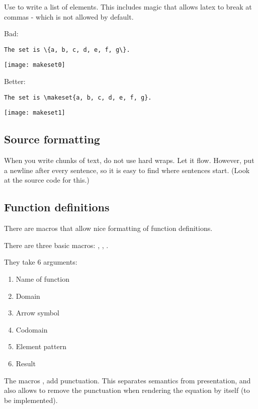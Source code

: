 Use \str{\makeset} to write a list of elements.
This includes magic that allows latex to break at commas - which is not allowed by default.

Bad:

\begin{verbatim}
The set is \{a, b, c, d, e, f, g\}.
\end{verbatim}
\begin{widepar}
    \centering
    \texttt{[image: makeset0]}
\end{widepar}

Better:

\begin{verbatim}
The set is \makeset{a, b, c, d, e, f, g}.
\end{verbatim}

\begin{widepar}
    \centering
    \texttt{[image: makeset1]}
\end{widepar}

\subsection{Source formatting}

When you write chunks of text, do not use hard wraps.
Let it flow.
However, put a newline after every sentence, so it is easy to find where sentences start.
(Look at the source code for this.)

\subsection{Function definitions}

There are macros that allow nice formatting of function definitions.

There are three basic macros:
, , .

They take 6 arguments:
\begin{enumerate}
    \item Name of function
    \item Domain
    \item Arrow symbol
    \item Codomain
    \item Element pattern
    \item Result
\end{enumerate}

The macros ,  add punctuation.
This separates semantics from presentation, and also allows to remove the punctuation when rendering the equation by itself (to be implemented).


